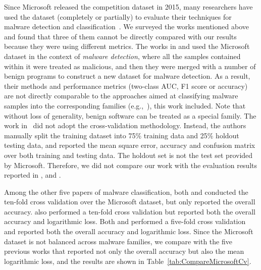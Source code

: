Since Microsoft released the competition dataset in 2015, many researchers have used the dataset (completely or partially) to evaluate their techniques for malware detection and classification~\cite{NovelFeatureFusion, EnsembleDNN, AutoEncoderMicrosoft, FunctionCallGraph, StaticFeatures, PolySeqCls, AutoEncoderFeatureLearn, YuxinMalwareDnn}.
We surveyed the works mentioned above and found that three of them cannot be directly compared with our results because they were using different metrics.
The works in \cite{EnsembleDNN} and \cite{YuxinMalwareDnn} used the Microsoft dataset in the context of \emph{malware detection}, where all the samples contained within it were treated as malicious, and then they were merged with a number of benign programs to construct a new dataset for malware detection.
As a result, their methods and performance metrics (two-class AUC, F1 score or accuracy) are not directly comparable to the approaches aimed at classifying malware samples into the corresponding families (e.g.,~\cite{NovelFeatureFusion, AutoEncoderMicrosoft, FunctionCallGraph, StaticFeatures, PolySeqCls, AutoEncoderFeatureLearn}), this work included. %
Note that without loss of generality, benign software can be treated as a special family.
The work in~\cite{AutoEncoderMicrosoft} did not adopt the cross-validation methodology. Instead, the authors manually split the training dataset into 75\% training data and 25\% holdout testing data, and reported the mean square error, accuracy and confusion matrix over both training and testing data.
The holdout set is not the test set provided by Microsoft. 
Therefore, we did not compare our work with the evaluation results reported in \cite{EnsembleDNN}, \cite{YuxinMalwareDnn} and \cite{AutoEncoderMicrosoft}.

Among the other five papers of malware classification, both \cite{FunctionCallGraph} and \cite{StaticFeatures} conducted the ten-fold cross validation over the Microsoft dataset, but only reported the overall accuracy.
\cite{PolySeqCls} also performed a ten-fold cross validation but reported both the overall accuracy and logarithmic loss.
Both \cite{NovelFeatureFusion} and \cite{AutoEncoderFeatureLearn} performed a five-fold cross validation and reported both the overall accuracy and logarithmic loss.
Since the Microsoft dataset is not balanced across malware families, we compare \sysname with the five previous works that reported not only the overall accuracy but also the mean logarithmic loss, and the results are shown in Table~\ref{tab:CompareMicrosoftCv}.

